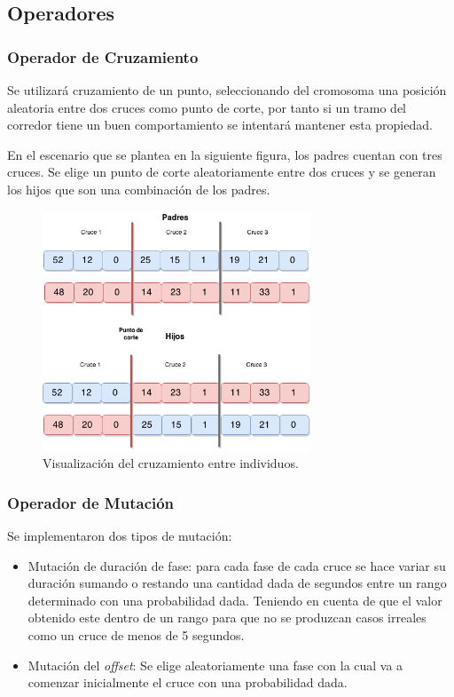 \subsection{Operadores}
\subsubsection{Operador de Cruzamiento}
Se  utilizará cruzamiento de un punto, seleccionando del cromosoma una posición aleatoria entre dos cruces como punto de corte, por tanto si un tramo del corredor tiene un buen comportamiento se intentará mantener esta propiedad.

En el escenario que se plantea en la siguiente figura, los padres cuentan con tres cruces. Se elige un punto de corte aleatoriamente entre dos cruces y se generan los hijos que son una combinación de los padres.

\begin{figure}[H]
	\centering
	\includegraphics[width=8cm]{Figures/alg_cruzamiento}
	\caption{Visualización del cruzamiento entre individuos.}
	\label{fig:op_cruzamiento}
\end{figure}



\subsubsection{Operador de Mutación}
Se implementaron dos tipos de mutación:
\begin{itemize}

\item Mutación de duración de fase: para cada fase de cada cruce se hace variar su duración sumando o restando una cantidad dada de segundos entre un rango determinado con una probabilidad dada. Teniendo en cuenta de que el valor obtenido este dentro de un rango para que no se produzcan casos irreales como un cruce de menos de 5 segundos.

\item Mutación del \emph{offset}: Se elige aleatoriamente una fase con la cual va a comenzar inicialmente el cruce con una probabilidad dada.
\end{itemize}

